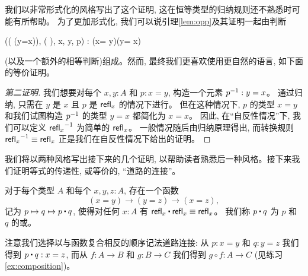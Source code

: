 我们以非常形式化的风格写出了这个证明, 这在恒等类型的归纳规则还不熟悉时可能有所帮助。
为了更加形式化, 我们可以说引理\ref{lem:opp}及其证明一起由判断
\begin{narrowmultline*}
   (( (y=x)), ( ), x, y, p)
  \narrowbreak :  (x= y)\to(y= x)
\end{narrowmultline*}
(以及一个额外的相等判断)组成。然而, 最终我们更喜欢使用更自然的语言, 如下面的等价证明。

\begin{proof}[第二证明]
  我们想要对每个 $x,y:A$ 和 $p:x=y$, 构造一个元素 $\mathord{{p}^{-1}}:y=x$。
  通过归纳, 只需在 $y$ 是 $x$ 且 $p$ 是 $\mathsf{refl}_{x}$ 的情况下进行。
  但在这种情况下, $p$ 的类型 $x=y$ 和我们试图构造 $\mathord{{p}^{-1}}$ 的类型 $y=x$ 都简化为 $x=x$。
  因此, 在``自反性情况''下, 我们可以定义 $\mathord{{\mathsf{refl}_{x}}^{-1}}$ 为简单的 $\mathsf{refl}_{x}$。
  一般情况随后由归纳原理得出, 而转换规则 $\mathord{{\mathsf{refl}_{x}}^{-1}}\equiv\mathsf{refl}_{x}$ 正是我们在自反性情况下给出的证明。
\end{proof}

我们将以两种风格写出接下来的几个证明, 以帮助读者熟悉后一种风格。接下来我们证明等式的传递性, 或等价的, ``道路的连接''。

\begin{lem}\label{lem:concat}
  对于每个类型 $A$ 和每个 $x,y,z:A$, 存在一个函数
  \begin{equation*}
  (x= y) \to   (y= z)\to (x=  z),
  \end{equation*}
  记为 $p \mapsto q \mapsto p\ct q$, 使得对任何 $x:A$ 有 $\refl{x}\ct \refl{x}\jdeq \refl{x}$。
  我们称 $p\ct q$ 为 $p$ 和 $q$ 的或。
\end{lem}

注意我们选择以与函数复合相反的顺序记法道路连接: 从 $p:x=y$ 和 $q:y=z$ 我们得到 $p\ct q : x=z$, 
而从 $f:A\to B$ 和 $g:B\to C$ 我们得到 $g\circ f : A\to C$ (见练习\ref{ex:composition})。

